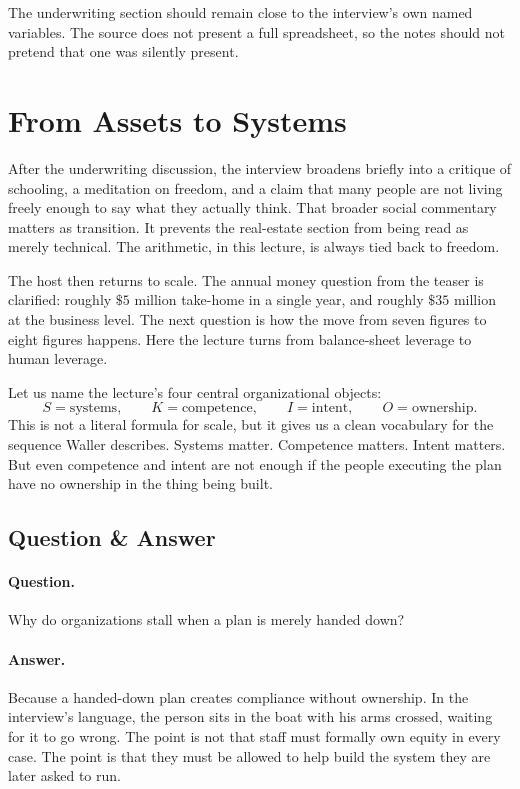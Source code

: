 \begin{remark}
The underwriting section should remain close to the interview's own named variables. The source does not present a full spreadsheet, so the notes should not pretend that one was silently present.
\end{remark}

\section{From Assets to Systems}

After the underwriting discussion, the interview broadens briefly into a critique of schooling, a meditation on freedom, and a claim that many people are not living freely enough to say what they actually think. That broader social commentary matters as transition. It prevents the real-estate section from being read as merely technical. The arithmetic, in this lecture, is always tied back to freedom.

The host then returns to scale. The annual money question from the teaser is clarified: roughly \(\$5\) million take-home in a single year, and roughly \(\$35\) million at the business level. The next question is how the move from seven figures to eight figures happens. Here the lecture turns from balance-sheet leverage to human leverage.

Let us name the lecture's four central organizational objects:
\[
S = \text{systems}, \qquad
K = \text{competence}, \qquad
I = \text{intent}, \qquad
O = \text{ownership}.
\]
This is not a literal formula for scale, but it gives us a clean vocabulary for the sequence Waller describes. Systems matter. Competence matters. Intent matters. But even competence and intent are not enough if the people executing the plan have no ownership in the thing being built.

\subsection{Question \& Answer}

\paragraph{Question.} Why do organizations stall when a plan is merely handed down?

\paragraph{Answer.} Because a handed-down plan creates compliance without ownership. In the interview's language, the person sits in the boat with his arms crossed, waiting for it to go wrong. The point is not that staff must formally own equity in every case. The point is that they must be allowed to help build the system they are later asked to run.

